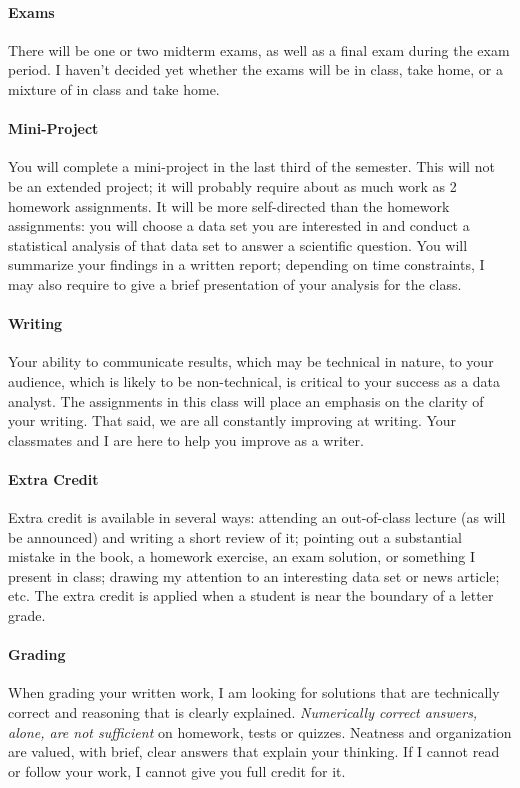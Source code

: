 \documentclass[11pt]{article}
\begin{document}
	\paragraph{Exams}
	There will be one or two midterm exams, as well as a final exam during the exam period.  I haven't decided yet whether the exams will be in class, take home, or a mixture of in class and take home.
	
	\paragraph{Mini-Project}
	You will complete a mini-project in the last third of the semester.  This will not be an extended project; it will probably require about as much work as 2 homework assignments.  It will be more self-directed than the homework assignments: you will choose a data set you are interested in and conduct a statistical analysis of that data set to answer a scientific question.  You will summarize your findings in a written report; depending on time constraints, I may also require to give a brief presentation of your analysis for the class.
	
	\paragraph{Writing}
	Your ability to communicate results, which may be technical in nature, to your audience, which is likely to be non-technical, is critical to your success as a data analyst. The assignments in this class will place an emphasis on the clarity of your writing.  That said, we are all constantly improving at writing.  Your classmates and I are here to help you improve as a writer.
	
	\paragraph{Extra Credit}
	Extra credit is available in several ways: attending an out-of-class lecture (as will be announced) and writing a short review of it; pointing out a substantial mistake in the book, a homework exercise, an exam solution, or something I present in class; drawing my attention to an interesting data set or news article; etc. The extra credit is applied when a student is near the boundary of a letter grade.
	
	\paragraph{Grading}
	When grading your written work, I am looking for solutions that are technically correct and reasoning that is clearly explained.  \emph{Numerically correct answers, alone, are not sufficient} on homework, tests or quizzes.  Neatness and organization are valued, with brief, clear answers that explain your thinking.  If I cannot read or follow your work, I cannot give you full credit for it.
	
\end{document}
